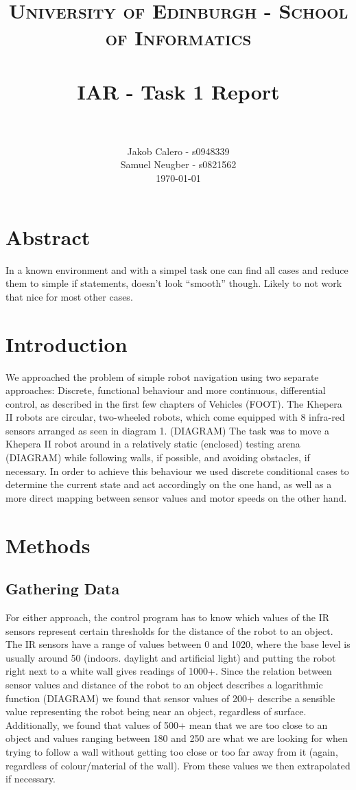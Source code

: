\documentclass[paper=a4, fontsize=12pt]{scrartcl}	%
\title{
\vspace{-1in} 	
\usefont{OT1}{bch}{b}{n}
\normalfont \normalsize \textsc{University of Edinburgh - School of Informatics} \\ [25pt]
\horrule{0.5pt} \\[0.4cm]
\large IAR - Task 1 Report \\
\horrule{1pt} \\[0.5cm]
}
\author{
  \normalfont \normalsize
  Jakob Calero - s0948339\\[-3pt]\normalsize
  Samuel Neugber - s0821562\\[-3pt]\normalsize
  \today
}
\date{}
\numberwithin{equation}{section}		%
\numberwithin{figure}{section}			%
\numberwithin{table}{section}				%
\begin{document}
\maketitle					%
\section{Abstract}
In a known environment and with a simpel task one can find all cases and reduce them to simple if statements, doesn't look “smooth” though. Likely to not work that nice for most other cases.

\section{Introduction}
We approached the problem of simple robot navigation using two separate approaches: Discrete, functional behaviour and more continuous, differential control, as described in the first few chapters of Vehicles (FOOT). The Khepera II robots are circular, two-wheeled robots, which come equipped with 8 infra-red sensors arranged as seen in diagram 1. (DIAGRAM) The task was to move a Khepera II robot around in a relatively static (enclosed) testing arena (DIAGRAM) while following walls, if possible, and avoiding obstacles, if necessary. In order to achieve this behaviour we used discrete conditional cases to determine the current state and act accordingly on the one hand, as well as a more direct mapping between sensor values and motor speeds on the other hand.

\section{Methods}
\subsection{Gathering Data}
For either approach, the control program has to know which values of the IR sensors represent certain thresholds for the distance of the robot to an object. The IR sensors have a range of values between 0 and 1020, where the base level is usually around 50 (indoors. daylight and artificial light)  and putting the robot right next to a white wall gives readings of 1000+. Since the relation between sensor values and distance of the robot to an object describes a logarithmic function (DIAGRAM) we found that sensor values of 200+ describe a sensible value representing the robot being near an object, regardless of surface. Additionally, we found that values of 500+ mean that we are too close to an object and values ranging between 180 and 250 are what we are looking for when trying to follow a wall without getting too close or too far away from it (again, regardless of colour/material of the wall). From these values we then extrapolated if necessary.
\end{document}
